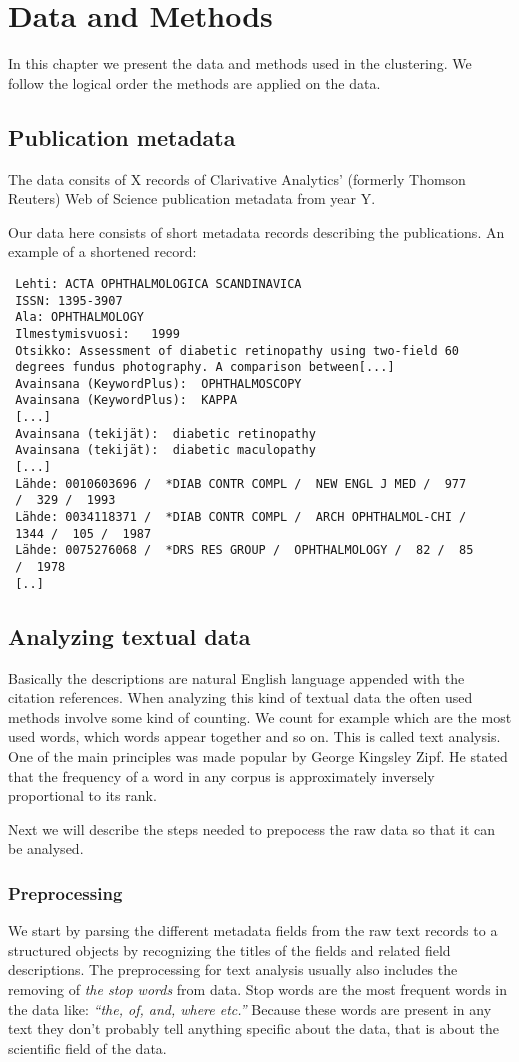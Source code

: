 \chapter{Data and Methods}
\label{chapter:methods}
In this chapter we present the data and methods used in the 
clustering. We follow the logical order the methods are applied on 
the data.

\section{Publication metadata}
The data consits of X records of Clarivative Analytics' 
(formerly Thomson Reuters) Web of Science publication metadata 
from year Y.

Our data here consists of short metadata records describing the 
publications. An example of a shortened record:
\begin{verbatim}
 Lehti: ACTA OPHTHALMOLOGICA SCANDINAVICA
 ISSN: 1395-3907
 Ala: OPHTHALMOLOGY
 Ilmestymisvuosi:   1999
 Otsikko: Assessment of diabetic retinopathy using two-field 60 
 degrees fundus photography. A comparison between[...]
 Avainsana (KeywordPlus):  OPHTHALMOSCOPY
 Avainsana (KeywordPlus):  KAPPA
 [...]
 Avainsana (tekijät):  diabetic retinopathy
 Avainsana (tekijät):  diabetic maculopathy
 [...]
 Lähde: 0010603696 /  *DIAB CONTR COMPL /  NEW ENGL J MED /  977 
 /  329 /  1993
 Lähde: 0034118371 /  *DIAB CONTR COMPL /  ARCH OPHTHALMOL-CHI /  
 1344 /  105 /  1987
 Lähde: 0075276068 /  *DRS RES GROUP /  OPHTHALMOLOGY /  82 /  85 
 /  1978
 [..]
\end{verbatim}

\section{Analyzing textual data}
Basically the descriptions are natural English 
language appended with the citation references. When analyzing 
this kind of textual data the often used methods involve some 
kind of counting. We count for example which
are the most used words, which words appear together and so on.
This is called text analysis. One of the main principles was made 
popular by George Kingsley Zipf. He stated that the frequency of 
a word in any corpus is approximately inversely proportional to 
its rank. 

Next we will describe the steps needed to prepocess the raw data
so that it can be analysed.
\subsection{Preprocessing}
We start by parsing the different metadata fields from the raw 
text records to a structured objects by recognizing the titles of 
the fields and related field descriptions.
The preprocessing for text analysis usually also 
includes the removing of \emph{the stop words} from data. Stop 
words are the most frequent words in the data like: \emph{``the, 
of, and, where etc.''} Because these words are present in any text 
they don't probably tell anything specific about the data, that is 
about the scientific field of the data. \cite{ref_here}

